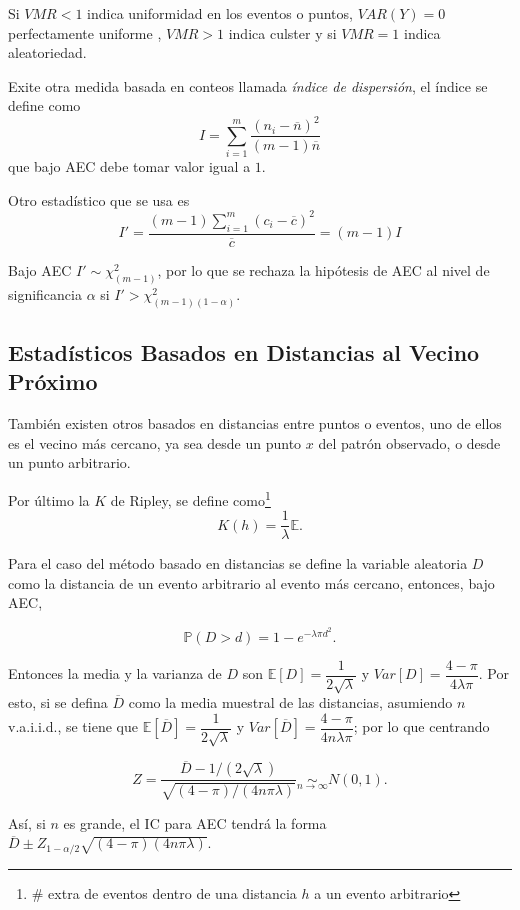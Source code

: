 \documentclass[12,]{article}
\let\rmarkdownfootnote\footnote%
\def\footnote{\protect\rmarkdownfootnote}
\begin{document}
Si $VMR < 1$ indica uniformidad en los eventos o puntos, $VAR(Y) = 0$
perfectamente uniforme , $VMR > 1$ indica culster y si $VMR = 1$ indica
aleatoriedad.

Exite otra medida basada en conteos llamada \emph{índice de dispersión},
el índice se define como\\\[
I = \sum\limits_{i=1}^m \dfrac{(n_i - \overline{n})^2}{(m-1) \overline{n}}
\] que bajo AEC debe tomar valor igual a $1$.

Otro estadístico que se usa es \[
I' =  \dfrac{(m-1)\sum\limits_{i=1}^m (c_i - \overline{c})^2}{\overline{c}} = (m-1)I
\]

Bajo AEC $I' \sim \chi^2_{(m-1)}$, por lo que se rechaza la hipótesis de
AEC al nivel de significancia $\alpha$ si
$I' > \chi^2_{(m-1)(1 - \alpha)}$.

\subsection{Estadísticos Basados en Distancias al Vecino
Próximo}\label{estadisticos-basados-en-distancias-al-vecino-proximo}

También existen otros basados en distancias entre puntos o eventos, uno
de ellos es el vecino más cercano, ya sea desde un punto $x$ del patrón
observado, o desde un punto arbitrario.

Por último la $K$ de Ripley, se define como\footnote{\# extra de eventos
  dentro de una distancia $h$ a un evento arbitrario} \[
K(h) = \dfrac{1}{\lambda} \mathbb{E}.
\]

Para el caso del método basado en distancias se define la variable
aleatoria $D$ como la distancia de un evento arbitrario al evento más
cercano, entonces, bajo AEC,

\[
\mathbb{P}(D>d) = 1 - e^{- \lambda \pi d^2}.
\]

Entonces la media y la varianza de $D$ son
$\mathbb{E}[D] = \dfrac{1}{2 \sqrt{\lambda}}$ y
$Var[D] = \dfrac{4 - \pi}{4 \lambda \pi}$. Por esto, si se defina
$\overline{D}$ como la media muestral de las distancias, asumiendo $n$
v.a.i.i.d., se tiene que
$\mathbb{E}[\overline{D}] = \dfrac{1}{2 \sqrt{\lambda}}$ y
$Var[\overline{D}] = \dfrac{4 - \pi}{4 n \lambda \pi}$; por lo que
centrando

\[
Z = \dfrac{\overline{D} - 1/ (2 \sqrt{\lambda})}{\sqrt{(4-\pi)/(4n\pi\lambda)}} \underset{n \to \infty}{\sim} N(0,1).
\]

Así, si $n$ es grande, el IC para AEC tendrá la forma
$\overline{D} \pm Z_{1- \alpha / 2} \sqrt{(4-\pi)(4n\pi\lambda)}$.
\end{document}
